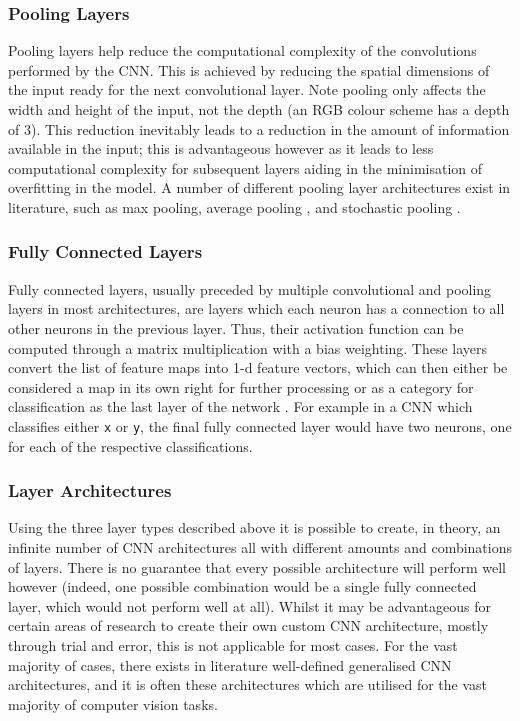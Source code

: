 \subsubsection{Pooling Layers}\label{ch:Background,sec:CNN,sub:CNN,subsubsec:pooling}
Pooling layers help reduce the computational complexity of the convolutions performed by the CNN. This is achieved by reducing the spatial dimensions of the input ready for the next convolutional layer. Note pooling only affects the width and height of the input, not the depth (an RGB colour scheme has a depth of 3). This reduction inevitably leads to a reduction in the amount of information available in the input; this is advantageous however as it leads to less computational complexity for subsequent layers aiding in the minimisation of overfitting in the model. A number of different pooling layer architectures exist in literature, such as max pooling, average pooling \cite{boureau_theoretical_2010}, and stochastic pooling \cite{zeiler_stochastic_2013}.

\subsubsection{Fully Connected Layers}\label{ch:Background,sec:CNN,sub:CNN,subsubsec:fullyConnected}
Fully connected layers, usually preceded by multiple convolutional and pooling layers in most architectures, are layers which each neuron has a connection to all other neurons in the previous layer. Thus, their activation function can be computed through a matrix multiplication with a bias weighting. These layers convert the list of feature maps into 1-d feature vectors, which can then either be considered a map in its own right for further processing \cite{krizhevsky_imagenet_2012} or as a category for classification as the last layer of the network \cite{girshick_rich_2014}. For example in a CNN which classifies either \texttt{x} or \texttt{y}, the final fully connected layer would have two neurons, one for each of the respective classifications. 

\subsubsection{Layer Architectures}\label{ch:Background,sec:CNN,sub:CNN,subsub:layerArchitecture}
Using the three layer types described above it is possible to create, in theory, an infinite number of CNN architectures all with different amounts and combinations of layers. There is no guarantee that every possible architecture will perform well however (indeed, one possible combination would be a single fully connected layer, which would not perform well at all). Whilst it may be advantageous for certain areas of research to create their own custom CNN architecture, mostly through trial and error, this is not applicable for most cases. For the vast majority of cases, there exists in literature well-defined generalised CNN architectures, and it is often these architectures which are utilised for the vast majority of computer vision tasks. 

